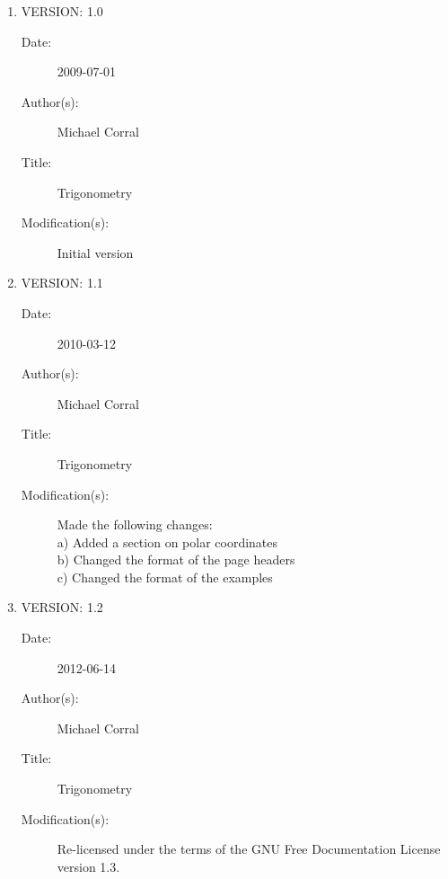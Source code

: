 \documentclass[paper=letter,fontsize=11pt,titlepage,openany,twoside,
numbers=noenddot,index=totoc]{scrbook}
\theoremstyle{definition}
\theoremstyle{itexmp}
\newcommand\myclearpage{\cleartooddpage
 [\thispagestyle{empty}]}
\numberwithin{figure}{section}
\begin{document}
\begin{enumerate}

\item VERSION: 1.0
\begin{description}
\item[Date:] 2009-07-01
\item[Author(s):] Michael Corral
\item[Title:] Trigonometry
\item[Modification(s):] Initial version
\end{description}

\item VERSION: 1.1
\begin{description}
\item[Date:] 2010-03-12
\item[Author(s):] Michael Corral
\item[Title:] Trigonometry
\item[Modification(s):] Made the following changes:\\
 a) Added a section on polar coordinates\\
 b) Changed the format of the page headers\\
 c) Changed the format of the examples
\end{description}

\item VERSION: 1.2
\begin{description}
\item[Date:] 2012-06-14
\item[Author(s):] Michael Corral
\item[Title:] Trigonometry
\item[Modification(s):] 
  Re-licensed under the terms of the GNU Free Documentation License
    version 1.3.
\end{description}

\end{enumerate}

\backmatter
\clearpage
{}
\printindex

\myclearpage
\end{document}
